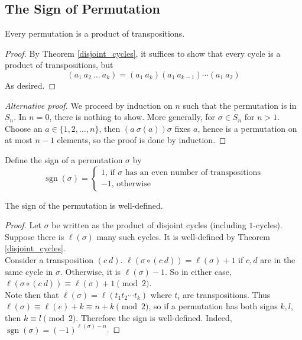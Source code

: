 \subsection{The Sign of Permutation}
\begin{proposition}
    Every permutation is a product of transpositions.
\end{proposition}
\begin{proof}
    By Theorem \ref{disjoint_cycles}, it suffices to show that every cycle is a product of transpositions, but
    $$(a_1\ a_2\ \ldots\ a_k)=(a_1\ a_k)(a_1\ a_{k-1})\cdots (a_1\ a_2)$$
    As desired.
\end{proof}
\begin{proof}[Alternative proof]
    We proceed by induction on $n$ such that the permutation is in $S_n$.
    In $n=0$, there is nothing to show.
    More generally, for $\sigma\in S_n$ for $n>1$.
    Choose an $a\in\{1,2,\ldots,n\}$, then $(a\ \sigma(a))\sigma$ fixes $a$, hence is a permutation on at most $n-1$ elements, so the proof is done by induction.
\end{proof}
\begin{definition}
    Define the sign of a permutation $\sigma$ by
    $$
    \operatorname{sgn}(\sigma)=
    \begin{cases}
        1\text{, if $\sigma$ has an even number of transpositions}\\
        -1\text{, otherwise}
    \end{cases}
    $$
\end{definition}
\begin{proposition}
    The sign of the permutation is well-defined.
\end{proposition}
\begin{proof}
    Let $\sigma$ be written as the product of disjoint cycles (including $1$-cycles).
    Suppose there is $\ell(\sigma)$ many such cycles.
    It is well-defined by Theorem \ref{disjoint_cycles}.\\
    Consider a transposition $(c\ d)$.
    $\ell(\sigma\circ (c\ d))=\ell(\sigma)+1$ if $c,d$ are in the same cycle in $\sigma$.
    Otherwise, it is $\ell(\sigma)-1$.
    So in either case, $\ell(\sigma\circ (c\ d))\equiv \ell(\sigma)+1\pmod{2}$.\\
    Note then that $\ell(\sigma)=\ell(t_1t_2\cdots t_k)$ where $t_i$ are transpositions.
    Thus $\ell(\sigma)\equiv\ell(e)+k\equiv n+k\pmod{2}$, so if a permutation has both signs $k,l$, then $k\equiv l\pmod{2}$.
    Therefore the sign is well-defined.
    Indeed, $\operatorname{sgn}(\sigma)=(-1)^{\ell(\sigma)-n}$.
\end{proof}
